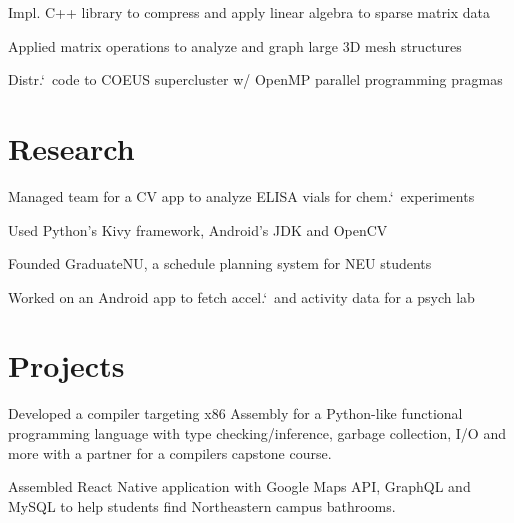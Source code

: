 \documentclass[letterpaper]{cv} %
\begin{document}
\begin{minipage}[t]{0.66\textwidth}

\begin{tightitemize}
  \item Impl. C++ library to compress and apply linear algebra to sparse matrix data
  \item Applied matrix operations to analyze and graph large 3D mesh structures
  \item Distr.`\ code to COEUS supercluster w/ OpenMP parallel programming pragmas
\end{tightitemize}

\section{Research}


\begin{tightitemize}
  \item Managed team for a CV app to analyze ELISA vials for chem.`\ experiments
  \item Used Python's Kivy framework, Android's JDK and OpenCV
  \item Founded GraduateNU, a schedule planning system for NEU students
  \item Worked on an Android app to fetch accel.`\ and activity data for a psych lab
\end{tightitemize}

\section{Projects}

Developed a compiler targeting x86 Assembly for a Python-like
functional programming language with type checking/inference,
garbage collection, I/O and more with a partner for a compilers
capstone course.
\sectionspace

Assembled React Native application with Google Maps API,
GraphQL and MySQL to help students find Northeastern campus bathrooms.
\sectionspace


\end{minipage}
\end{document}
